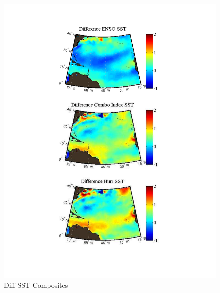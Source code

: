 \documentclass[]{article}
\begin{document}
\begin{figure}[ht]
\begin{minipage}[b]{0.55\linewidth}
\includegraphics[width=\textwidth]{figures/comboIndex/composites/compareMDRCompositesSST.pdf}
\caption{Diff SST Composites}
\label{fig:figure35}
\end{minipage}
\end{figure}
\end{document}
